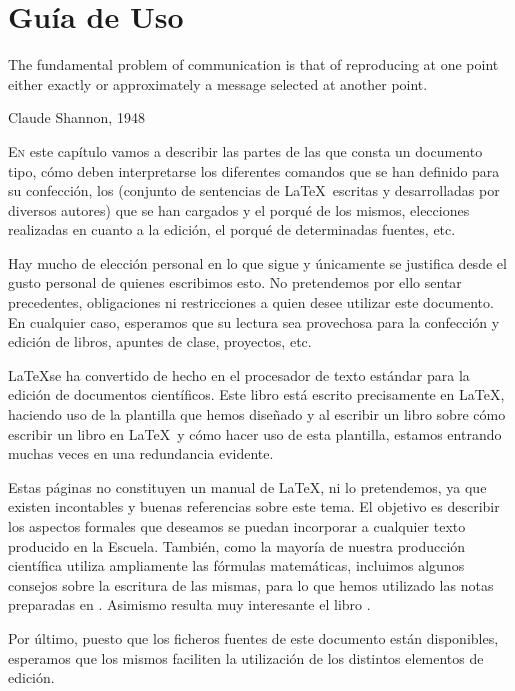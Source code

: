\chapter{Guía de Uso}\label{chp-01}
\epigraph{The fundamental problem of communication is that of reproducing at one point either exactly or approximately a message selected at another point.}{Claude Shannon, 1948}

\lettrine[lraise=-0.1, lines=2, loversize=0.2]{E}{n} este capítulo vamos a describir las partes de las que consta un documento tipo, cómo deben interpretarse los diferentes comandos que se han definido para su confección, los  (conjunto de sentencias de \LaTeX\ escritas y desarrolladas por diversos autores) que se han cargados y el porqué de los mismos, elecciones realizadas en cuanto a la edición, el porqué de determinadas fuentes, etc. 

Hay mucho de elección personal en lo que sigue y únicamente se justifica desde el gusto personal de quienes escribimos esto. No pretendemos por ello sentar precedentes, obligaciones ni restricciones a quien desee utilizar este documento. En cualquier caso, esperamos que su lectura sea provechosa para la confección y edición de libros, apuntes de clase, proyectos, etc.

\LaTeX se ha convertido de hecho en el procesador de texto estándar para la edición de documentos científicos. Este libro está escrito precisamente en \LaTeX, haciendo uso de la plantilla que hemos diseñado y al escribir un libro sobre cómo escribir un libro en \LaTeX\  y cómo hacer uso de esta plantilla, estamos entrando muchas veces en una redundancia evidente.

Estas páginas no constituyen un manual de \LaTeX,  ni lo pretendemos, ya que existen incontables y buenas referencias sobre este tema. El objetivo es describir los aspectos formales que deseamos se puedan incorporar a cualquier texto producido en la Escuela.  También, como la mayoría de nuestra producción científica utiliza ampliamente las fórmulas matemáticas, incluimos algunos consejos sobre la escritura de las mismas, para lo que hemos utilizado las notas preparadas en \cite{moser}. Asimismo resulta muy interesante el libro \cite{gratzer}.

Por último, puesto que los ficheros fuentes de este documento están disponibles, esperamos que los mismos faciliten la utilización de los distintos elementos de edición.

